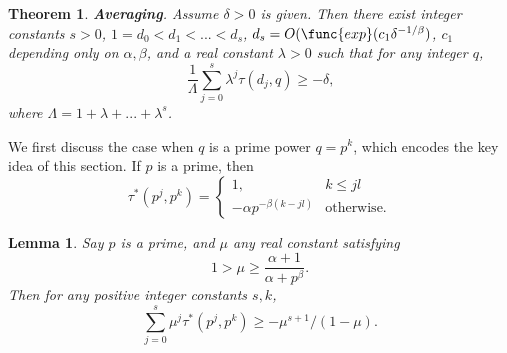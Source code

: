 \documentclass{amsart}
\newtheorem {theorem}{Theorem}
\newtheorem {lemma}{Lemma}
\numberwithin {equation}{section}
\begin{document}
\begin{theorem}
\label{t:averaging}\textbf{Averaging}. Assume $\delta >0$ is given. Then
there exist integer constants $s>0$, $1=d_{0}<d_{1}<...<d_{s}$, $d_{s}=O(\func{exp}(c_{1}\delta ^{-1/\beta })$, $c_{1}$ depending only on $\alpha
,\beta $, and a real constant $\lambda >0$ such that for any integer $q$, 
\begin{equation}
\frac{1}{\Lambda }\sum_{j=0}^{s}\lambda ^{j}\tau (d_{j},q)\geq -\delta {\text{,}}  \label{r:averaging}
\end{equation}where $\Lambda =1+\lambda +...+\lambda ^{s}$.
\end{theorem}

We first discuss the case when $q$ is a prime power $q=p^{k}$, which encodes
the key idea of this section. If $p$ is a prime, then 
\begin{equation*}
\tau ^*(p^{j},p^{k})=\left \{ 
\begin{array}{cc}
1, & k\leq jl \\ 
-\alpha p^{-\beta (k-jl)} & {\text {otherwise.}}\end{array}
\right .
\end{equation*}

\begin{lemma}
\label{l:av1}Say $p$ is a prime, and $\mu $ any real constant satisfying 
\begin{equation}
1>\mu \geq \frac{\alpha +1}{\alpha +p^{\beta }}{\text {.}}  \label{r:mu}
\end{equation}
Then for any positive integer constants $s,k$, 
\begin{equation}
\sum _{j=0}^{s}\mu ^{j}\tau ^*(p^{j},p^{k})\geq -\mu ^{s+1}/(1-\mu ){\text {.}}  \label{r:mu0}
\end{equation}
\end{lemma}
\end{document}
